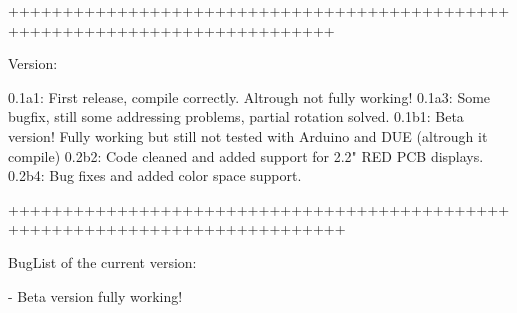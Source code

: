 ++++++++++++++++++++++++++++++++++++++++++++++++++++++++++++++++++++++++++++

Version\+: \begin{DoxyVerb}0.1a1: First release, compile correctly. Altrough not fully working!
0.1a3: Some bugfix, still some addressing problems, partial rotation solved.
0.1b1: Beta version! Fully working but still not tested with Arduino and DUE (altrough it compile)
0.2b2: Code cleaned and added support for 2.2" RED PCB displays.
0.2b4: Bug fixes and added color space support.
\end{DoxyVerb}
 +++++++++++++++++++++++++++++++++++++++++++++++++++++++++++++++++++++++++++++

Bug\+List of the current version\+: \begin{DoxyVerb}- Beta version fully working!\end{DoxyVerb}
 